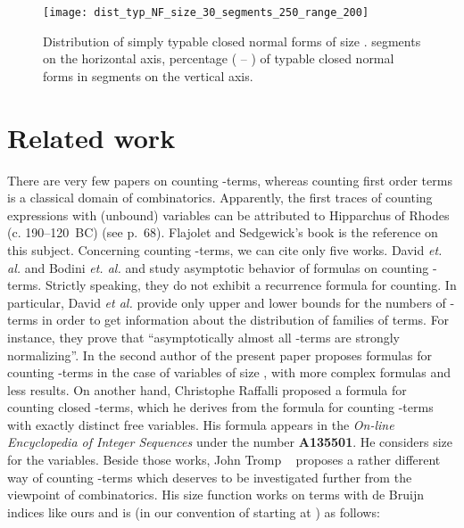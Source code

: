 \documentclass{jfp1}
\begin{document}
\begin{figure}[htb!]
  \centering
   \texttt{[image: dist\_typ\_NF\_size\_30\_segments\_250\_range\_200]}
  \ifJFP
\else
\\\centerline{}
\fi
  \caption{Distribution of simply typable closed normal forms  of size \textbf{}.  segments on the
    horizontal axis, percentage ( -- ) of typable closed normal forms in segments on the vertical axis.}
  \label{fig:dist_typed_NF_size_30}
\end{figure}



\section{Related work}
\label{sec:related-work}


There are very few papers on counting -terms, whereas counting first order
terms is a classical domain of combinatorics. Apparently, the first traces of
counting expressions with (unbound) variables can be attributed to Hipparchus of
Rhodes (c. 190--120~BC) (see \cite{flajolet08:_analy_combin} p.~68).  Flajolet and
Sedgewick's book \cite{flajolet08:_analy_combin} is the reference on this subject.
Concerning counting -terms, we can cite only five works.  \ifJFP David
\emph{et. al.}  and Bodini \emph{et. al.}
 \else \cite{DBLP:journals/corr/abs-0903-5505} and
\cite{gittenberger-2011-ltbuh} \fi study asymptotic behavior of formulas on counting
-terms.  Strictly speaking, they do not exhibit a recurrence formula for
counting.  In particular, David \emph{et al.} \ifJFP
{} \else
\cite{DBLP:journals/corr/abs-0903-5505} \fi provide only upper and lower bounds for
the numbers of -terms in order to get information about the distribution of
families of terms. For instance, they prove that ``asymptotically almost all
-terms are strongly normalizing''.  In \cite{DBLP:journals/tcs/Lescanne13} the
second author of the present paper proposes formulas for counting -terms in the
case of variables of size , with more complex formulas and less results.  On
another hand, Christophe Raffalli proposed a formula for counting closed -terms,
which he derives from the formula for counting -terms with exactly  distinct
free variables.  His formula appears in the \emph{On-line Encyclopedia of Integer
  Sequences} under the number \textbf{A135501}.  He considers size  for the
variables.  Beside those works, John Tromp \ifJFP
{} \else ~\cite{DBLP:conf/dagstuhl/Tromp06} \fi
proposes a rather different way of counting -terms which deserves to be
investigated further from the viewpoint of combinatorics.  His size function works on
terms with de Bruijn indices like ours and is (in our convention of starting at )
as follows:
  
\end{document}
